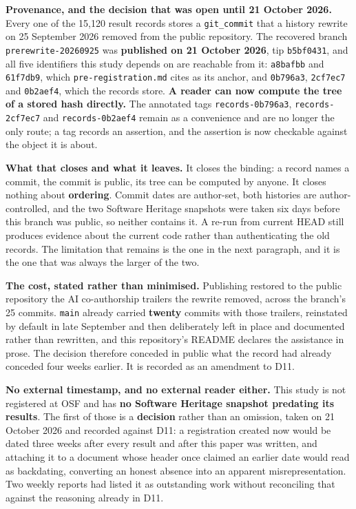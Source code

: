 \documentclass[
  10pt,
]{article}
\begin{document}
\textbf{Provenance, and the decision that was open until 21 October
2026.} Every one of the 15,120 result records stores a
\texttt{git\_\allowbreak{}commit} that a history rewrite on 25 September 2026 removed
from the public repository. The recovered branch
\texttt{prerewrite-20260925} was \textbf{published on 21 October 2026},
tip \texttt{b5bf0431}, and all five identifiers this study depends on
are reachable from it: \texttt{a8bafbb} and \texttt{61f7db9}, which
\texttt{pre-registration.md} cites as its anchor, and \texttt{0b796a3},
\texttt{2cf7ec7} and \texttt{0b2aef4}, which the records store.
\textbf{A reader can now compute the tree of a stored hash directly.}
The annotated tags \texttt{records-0b796a3}, \texttt{records-2cf7ec7}
and \texttt{records-0b2aef4} remain as a convenience and are no longer
the only route; a tag records an assertion, and the assertion is now
checkable against the object it is about.

\textbf{What that closes and what it leaves.} It closes the binding: a
record names a commit, the commit is public, its tree can be computed by
anyone. It closes nothing about \textbf{ordering}. Commit dates are
author-set, both histories are author-controlled, and the two Software
Heritage snapshots were taken six days before this branch was public, so
neither contains it. A re-run from current HEAD still produces evidence
about the current code rather than authenticating the old records. The
limitation that remains is the one in the next paragraph, and it is the
one that was always the larger of the two.

\textbf{The cost, stated rather than minimised.} Publishing restored to
the public repository the AI co-authorship trailers the rewrite removed,
across the branch's 25 commits. \texttt{main} already carried
\textbf{twenty} commits with those trailers, reinstated by default in
late September and then deliberately left in place and documented rather
than rewritten, and this repository's README declares the assistance in
prose. The decision therefore conceded in public what the record had
already conceded four weeks earlier. It is recorded as an amendment to
D11.

\textbf{No external timestamp, and no external reader either.} This
study is not registered at OSF and has \textbf{no Software Heritage
snapshot predating its results}. The first of those is a
\textbf{decision} rather than an omission, taken on 21 October 2026 and
recorded against D11: a registration created now would be dated three
weeks after every result and after this paper was written, and attaching
it to a document whose header once claimed an earlier date would read as
backdating, converting an honest absence into an apparent
misrepresentation. Two weekly reports had listed it as outstanding work
without reconciling that against the reasoning already in D11.
\end{document}
